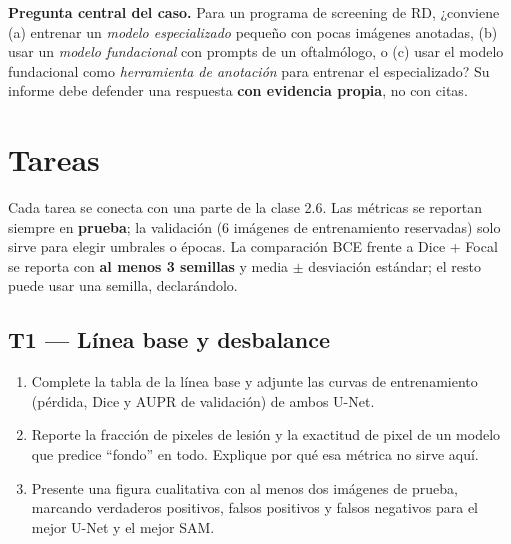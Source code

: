 \documentclass[11pt, a4paper]{article}
\newcommand{\enlace}[1]{\par\vspace{2pt}{\footnotesize\color{StanfordGray}%
	$\hookrightarrow$\  #1}}
\begin{document}
\begin{pregunta}
\textbf{Pregunta central del caso.} Para un programa de screening de RD, ¿conviene (a) entrenar un \emph{modelo especializado} peque\~no con pocas im\'agenes anotadas, (b) usar un \emph{modelo fundacional} con prompts de un oftalm\'ologo, o (c) usar el modelo fundacional como \emph{herramienta de anotaci\'on} para entrenar el especializado? Su informe debe defender una respuesta \textbf{con evidencia propia}, no con citas.
\end{pregunta}

\section{Tareas}

Cada tarea se conecta con una parte de la clase 2.6. Las m\'etricas se reportan siempre en \textbf{prueba}; la validaci\'on (6 im\'agenes de entrenamiento reservadas) solo sirve para elegir umbrales o \'epocas. La comparaci\'on BCE frente a Dice + Focal se reporta con \textbf{al menos 3 semillas} y media $\pm$ desviaci\'on est\'andar; el resto puede usar una semilla, declar\'andolo.

\subsection*{T1 --- Línea base y desbalance}
\begin{enumerate}
	\item Complete la tabla de la l\'inea base y adjunte las curvas de entrenamiento (p\'erdida, Dice y AUPR de validaci\'on) de ambos U-Net.
	\item Reporte la fracci\'on de pixeles de lesi\'on y la exactitud de pixel de un modelo que predice ``fondo'' en todo. Explique por qu\'e esa m\'etrica no sirve aqu\'i.
	\item Presente una figura cualitativa con al menos dos im\'agenes de prueba, marcando verdaderos positivos, falsos positivos y falsos negativos para el mejor U-Net y el mejor SAM.
\end{enumerate}
\end{document}

